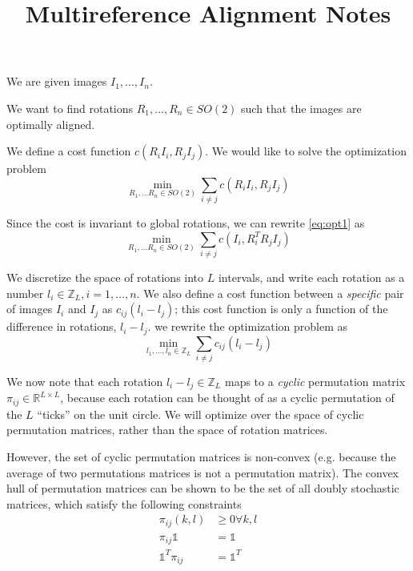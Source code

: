 \documentclass[12pt]{article}
\title{Multireference Alignment Notes}
\begin{document}
\maketitle

We are given images $I_1, \dots, I_n$.

We want to find rotations $R_1, \dots, R_n \in SO(2)$ such that the images are optimally aligned.

We define a cost function $c(R_i I_i, R_j I_j)$.
%
We would like to solve the optimization problem
\begin{equation} \label{eq:opt1}
\min_{R_1, \dots R_n \in SO(2)} \sum_{i \ne j} c(R_i I_i, R_j I_j)
\end{equation}

Since the cost is invariant to global rotations, we can rewrite \eqref{eq:opt1} as
\begin{equation}
\min_{R_1, \dots R_n \in SO(2)} \sum_{i \ne j} c(I_i, R_i^T R_j I_j)
\end{equation}

We discretize the space of rotations into $L$ intervals, and write each rotation as a number $l_i \in \mathbb{Z}_L, i=1, \dots, n$. 
%
We also define a cost function between a {\em specific} pair of images $I_i$ and $I_j$ as $c_{ij}(l_i - l_j)$; 
this cost function is only a function of the difference in rotations, $l_i - l_j$. 
%
we rewrite the optimization problem as
$$\min_{l_1, \dots, l_n \in \mathbb{Z}_L} \sum_{i \ne j} c_{ij} (l_i - l_j)$$

We now note that each rotation $l_i-l_j \in \mathbb{Z}_L$ maps to a {\em cyclic} permutation matrix $\pi_{ij} \in \mathbb{R}^{L \times L}$, because each rotation can be thought of as a cyclic permutation of the $L$ ``ticks'' on the unit circle.
%
We will optimize over the space of cyclic permutation matrices, rather than the space of rotation matrices.

However, the set of cyclic permutation matrices is non-convex (e.g. because the average of two permutations matrices is not a permutation matrix). 
%
The convex hull of permutation matrices can be shown to be the set of all doubly stochastic matrices, which satisfy the following constraints
\begin{equation} \label{eq:doublestoch}
\begin{aligned}
\pi_{ij}(k,l) &  \ge 0 \forall k, l \\
\pi_{ij} \mathds{1} & = \mathds{1}\\
\mathds{1}^T \pi_{ij} & = \mathds{1}^T 
\end{aligned}
\end{equation}
\end{document}
